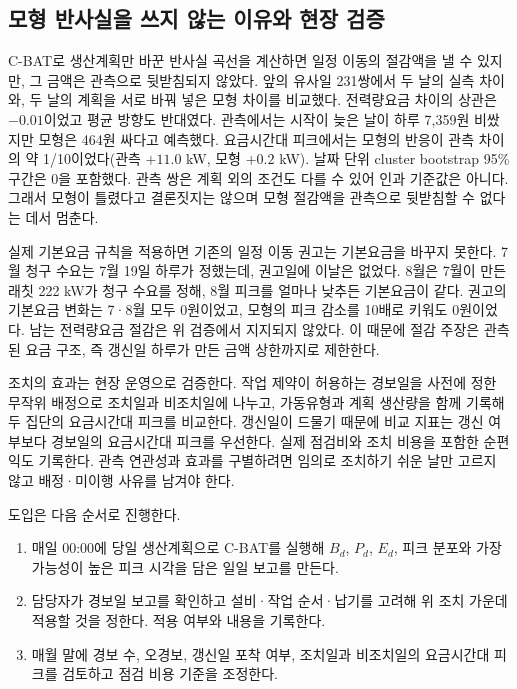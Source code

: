 \subsection{모형 반사실을 쓰지 않는 이유와 현장 검증}

C-BAT로 생산계획만 바꾼 반사실 곡선을 계산하면 일정 이동의 절감액을 낼 수 있지만, 그 금액은 관측으로 뒷받침되지 않았다. 앞의 유사일 231쌍에서 두 날의 실측 차이와, 두 날의 계획을 서로 바꿔 넣은 모형 차이를 비교했다. 전력량요금 차이의 상관은 $-0.01$이었고 평균 방향도 반대였다. 관측에서는 시작이 늦은 날이 하루 7,359원 비쌌지만 모형은 464원 싸다고 예측했다. 요금시간대 피크에서는 모형의 반응이 관측 차이의 약 1/10이었다(관측 $+11.0$ kW, 모형 $+0.2$ kW). 날짜 단위 cluster bootstrap 95\% 구간은 0을 포함했다. 관측 쌍은 계획 외의 조건도 다를 수 있어 인과 기준값은 아니다. 그래서 모형이 틀렸다고 결론짓지는 않으며 모형 절감액을 관측으로 뒷받침할 수 없다는 데서 멈춘다.

실제 기본요금 규칙을 적용하면 기존의 일정 이동 권고는 기본요금을 바꾸지 못한다. 7월 청구 수요는 7월 19일 하루가 정했는데, 권고일에 이날은 없었다. 8월은 7월이 만든 래칫 222 kW가 청구 수요를 정해, 8월 피크를 얼마나 낮추든 기본요금이 같다. 권고의 기본요금 변화는 7·8월 모두 0원이었고, 모형의 피크 감소를 10배로 키워도 0원이었다. 남는 전력량요금 절감은 위 검증에서 지지되지 않았다. 이 때문에 절감 주장은 관측된 요금 구조, 즉 갱신일 하루가 만든 금액 상한까지로 제한한다.

조치의 효과는 현장 운영으로 검증한다. 작업 제약이 허용하는 경보일을 사전에 정한 무작위 배정으로 조치일과 비조치일에 나누고, 가동유형과 계획 생산량을 함께 기록해 두 집단의 요금시간대 피크를 비교한다. 갱신일이 드물기 때문에 비교 지표는 갱신 여부보다 경보일의 요금시간대 피크를 우선한다. 실제 점검비와 조치 비용을 포함한 순편익도 기록한다. 관측 연관성과 효과를 구별하려면 임의로 조치하기 쉬운 날만 고르지 않고 배정·미이행 사유를 남겨야 한다.

도입은 다음 순서로 진행한다.
\begin{enumerate}
\item 매일 00:00에 당일 생산계획으로 C-BAT를 실행해 $B_d$, $P_d$, $E_d$, 피크 분포와 가장 가능성이 높은 피크 시각을 담은 일일 보고를 만든다.
\item 담당자가 경보일 보고를 확인하고 설비·작업 순서·납기를 고려해 위 조치 가운데 적용할 것을 정한다. 적용 여부와 내용을 기록한다.
\item 매월 말에 경보 수, 오경보, 갱신일 포착 여부, 조치일과 비조치일의 요금시간대 피크를 검토하고 점검 비용 기준을 조정한다.
\end{enumerate}

